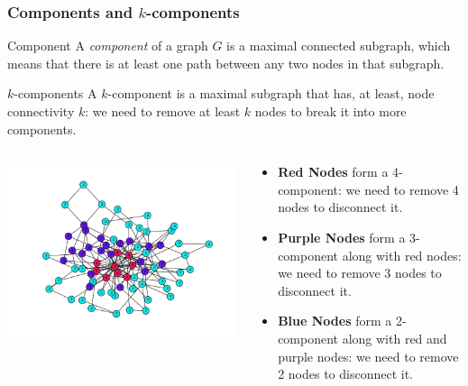 \documentclass[ignorenonframetext,red,8pt,notes=hide]{beamer}
\begin{document}
\begin{frame}
\frametitle{Components and $k$-components}

\begin{block}{Component}
A \emph{component} of a graph $G$ is a maximal connected subgraph, which means that there is at least one path between any two nodes in that subgraph.
\end{block}

\begin{block}{$k$-components}
A $k$-component is a maximal subgraph that has, at least, node connectivity $k$: we need to remove at least $k$ nodes to break it into more components. 
\end{block}

\begin{columns}[c]
\begin{column}{0.4\textwidth}
\begin{center}
\includegraphics[scale=0.25]{img/knum_colors}
\end{center}
\end{column}

\begin{column}{0.6\textwidth}
\begin{itemize}
\item \textbf{Red Nodes} form a 4-component: we need to remove 4 nodes to disconnect it.
\item \textbf{Purple Nodes} form a 3-component along with red nodes: we need to remove 3 nodes to disconnect it.
\item \textbf{Blue Nodes} form a 2-component along with red and purple nodes: we need to remove 2 nodes to disconnect it. 
\end{itemize}
\end{column}
\end{columns}

\end{frame}
\end{document}
